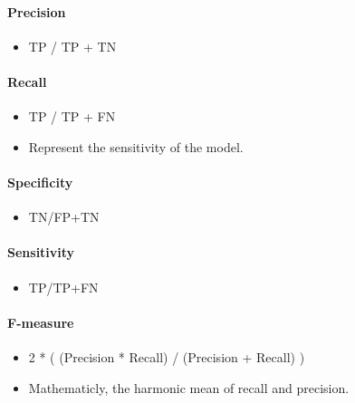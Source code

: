 \documentclass[11pt]{article}
\providecommand{\tightlist}{%
      \setlength{\itemsep}{0pt}\setlength{\parskip}{0pt}}
\begin{document}
    \hypertarget{precision}{%
\paragraph{Precision}\label{precision}}

\begin{itemize}
\tightlist
\item
  TP / TP + TN
\end{itemize}

    \hypertarget{recall}{%
\paragraph{Recall}\label{recall}}

\begin{itemize}
\tightlist
\item
  TP / TP + FN
\item
  Represent the sensitivity of the model.
\end{itemize}

    \hypertarget{specificity}{%
\paragraph{Specificity}\label{specificity}}

\begin{itemize}
\tightlist
\item
  TN/FP+TN
\end{itemize}

    \hypertarget{sensitivity}{%
\paragraph{Sensitivity}\label{sensitivity}}

\begin{itemize}
\tightlist
\item
  TP/TP+FN
\end{itemize}

    \hypertarget{f-measure}{%
\paragraph{F-measure}\label{f-measure}}

\begin{itemize}
\tightlist
\item
  2 * ( (Precision * Recall) / (Precision + Recall) )
\item
  Mathematicly, the harmonic mean of recall and precision.
\end{itemize}
\end{document}
